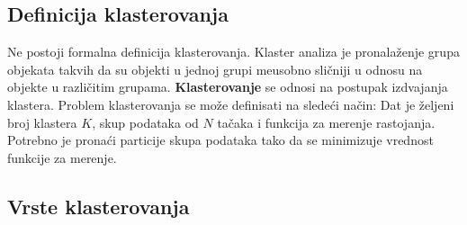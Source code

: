 \documentclass{article}
\begin{document}
\subsection{\selectfont Definicija klasterovanja}

Ne postoji formalna definicija klasterovanja. Klaster analiza je pronala\v{z}enje grupa objekata takvih da su objekti u jednoj grupi me\dj usobno sli\v{c}niji u odnosu na objekte u razli\v{c}itim grupama. \textbf{Klasterovanje} se odnosi na postupak izdvajanja klastera. Problem klasterovanja se mo\v{z}e definisati na slede\'{c}i na\v{c}in: Dat je \v{z}eljeni broj klastera $K$, skup podataka od $N$ ta\v{c}aka i funkcija za merenje rastojanja. Potrebno je prona\'ci particije skupa podataka tako da se minimizuje vrednost funkcije za merenje.

\subsection{\selectfont Vrste klasterovanja}
\end{document}
